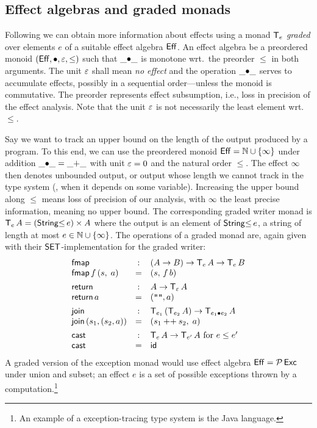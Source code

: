 \documentclass[acmsmall,review,anonymous]{acmart}\settopmatter{printfolios=true,printccs=false,printacmref=false}
\theoremstyle{remark}
\begin{document}
\subsection{Effect algebras and graded monads}
\label{sec:graded_monad}

Following \citet{katsumata:popl14}
we can obtain more information about effects using a monad $\T[e]$
\emph{graded} over elements $e$ of a suitable effect algebra $\Eff$.
An effect algebra be a preordered monoid
$(\Eff,\bu,\Ge,\leq)$ such that $\_{\bu}\_$ is monotone wrt.\ the
preorder $\leq$ in both arguments.  The unit $\Ge$ shall mean \emph{no
  effect} and the operation $\_{\bu}\_$ serves to accumulate effects,
possibly in a sequential order---unless the monoid is commutative.  The
preorder represents effect subsumption, i.e., loss in precision of the
effect analysis.  Note that the unit $\Ge$ is not necessarily the least element
wrt.\ $\leq$.

Say we want to track an upper bound on the length of the output
produced by a program.  To this end, we can use the preordered monoid
$\Eff = \bN \cup \{\infty\}$ under addition $\_{\bu}\_ = \_{+}\_$
with unit $\Ge = 0$ and the
natural order $\leq$.  The effect $\infty$ then denotes unbounded output, or
output whose length we cannot track in the type system (\eg, when it
depends on some variable).  Increasing the upper bound along $\leq$
means loss of precision of our analysis, with $\infty$ the least
precise information, meaning no upper bound.  The corresponding graded
writer monad is $\T[e]\,A = (\StringLe e) \times A$ where the output is an
element of $\StringLe e$, a string of length at most $e \in \bN \cup
\{\infty\}$.  The operations of a graded monad are, again given with
their $\SET$-implementation for the graded writer:
\[
\begin{array}{lcl}
\tfmap & : & (A \to B) \to \T[e]\,A \to \T[e]\,B \\
\tfmap\, f\, (s,\; a) & = & (s,\, f\, b)
\\[1ex]
\treturn & : & A \to \T[\Ge]\,A \\
\treturn\, a & = & (\verb|""|, a)
\\[1ex]
\tjoin & : & \T[e_1]\,(\T[e_2]\,A) \to \T[e_1 \bu e_2]\,A \\
\tjoin\,(s_1,(s_2,a)) & = & (s_1 \append s_2,\; a)
\\[1ex]
\tcast & : & \T[e]\,A \to \T[e']\,A \mbox{ for } e \leq e'\\
\tcast & = & \tid \\
\end{array}
\]
A graded version of the exception monad would use effect algebra
$\Eff = \Pot\Exc$ under union and subset; an effect $e$ is a set of
possible exceptions thrown by a computation.\footnote{An example of a
  exception-tracing type system is the Java language.}
\end{document}
